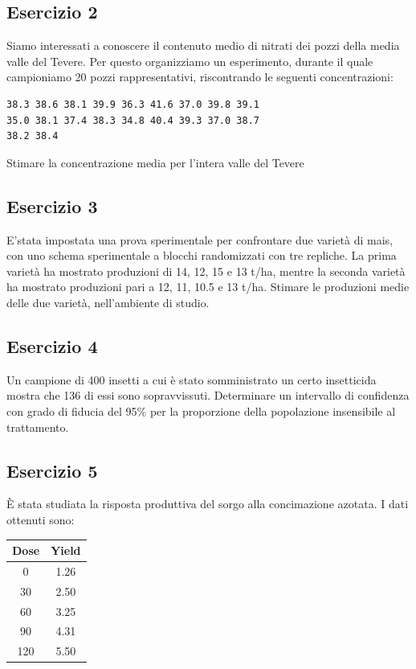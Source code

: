 \documentclass[a4paper,12pt,oneside]{book}
\begin{document}
\hypertarget{esercizio-2-2}{%
\subsection{Esercizio 2}\label{esercizio-2-2}}

Siamo interessati a conoscere il contenuto medio di nitrati dei pozzi della media valle del Tevere. Per questo organizziamo un esperimento, durante il quale campioniamo 20 pozzi rappresentativi, riscontrando le seguenti concentrazioni:

\begin{verbatim}
38.3 38.6 38.1 39.9 36.3 41.6 37.0 39.8 39.1     
35.0 38.1 37.4 38.3 34.8 40.4 39.3 37.0 38.7    
38.2 38.4    
\end{verbatim}

Stimare la concentrazione media per l'intera valle del Tevere

\hypertarget{esercizio-3-2}{%
\subsection{Esercizio 3}\label{esercizio-3-2}}

E'stata impostata una prova sperimentale per confrontare due varietà di mais, con uno schema sperimentale a blocchi randomizzati con tre repliche. La prima varietà ha mostrato produzioni di 14, 12, 15 e 13 t/ha, mentre la seconda varietà ha mostrato produzioni pari a 12, 11, 10.5 e 13 t/ha. Stimare le produzioni medie delle due varietà, nell'ambiente di studio.

\hypertarget{esercizio-4-1}{%
\subsection{Esercizio 4}\label{esercizio-4-1}}

Un campione di 400 insetti a cui è stato somministrato un certo insetticida mostra che 136 di essi sono sopravvissuti. Determinare un intervallo di confidenza con grado di fiducia del 95\% per la proporzione della popolazione insensibile al trattamento.

\hypertarget{esercizio-5-1}{%
\subsection{Esercizio 5}\label{esercizio-5-1}}

È stata studiata la risposta produttiva del sorgo alla concimazione azotata. I dati ottenuti sono:

\begin{longtable}[]{@{}cc@{}}
\toprule
Dose & Yield \\
\midrule
\endhead
0 & 1.26 \\
30 & 2.50 \\
60 & 3.25 \\
90 & 4.31 \\
120 & 5.50 \\
\bottomrule
\end{longtable}
\end{document}
